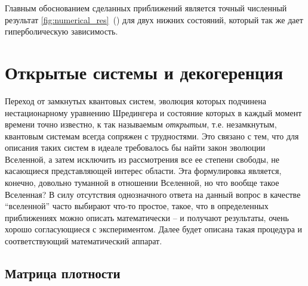 \documentclass[12pt, twoside]{report}
\numberwithin{equation}{section}
\numberwithin{figure}{section}
\begin{document}
Главным обоснованием сделанных приближений является точный численный результат \autoref{fig:numerical_res}~() для двух нижних состояний, который так же дает гиперболическую зависимость.

\section{Открытые системы и декогеренция}

Переход от замкнутых квантовых систем, эволюция которых подчинена нестационарному уравнению Шредингера и состояние которых в каждый момент времени точно известно, к так называемым \textit{открытым}, т.е. незамкнутым, квантовым системам всегда сопряжен с трудностями. Это связано с тем, что для описания таких систем в идеале требовалось бы найти закон эволюции Вселенной, а затем исключить из рассмотрения все ее степени свободы, не касающиеся представляющей интерес области. Эта формулировка является, конечно, довольно туманной в отношении Вселенной, но что вообще такое Вселенная? В силу отсутствия однозначного ответа на данный вопрос в качестве ``вселенной'' часто выбирают что-то простое, такое, что в определенных приближениях можно описать математически -- и получают результаты, очень хорошо согласующиеся с экспериментом\cite{bishop2009}. Далее будет описана такая процедура и соответствующий математический аппарат.

\subsection{Матрица плотности}
\end{document}
